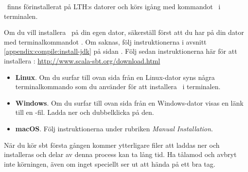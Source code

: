 \sbt\ finns förinstallerat på LTH:s datorer och körs igång med kommandot \sbt\ i terminalen.

Om du vill installera \sbt\ på din egen dator,
säkerställ först att du har  på din dator med terminalkommandot . Om  saknas, följ instruktionerna i avsnitt \ref{appendix:compile:install-jdk} på sidan \pageref{appendix:compile:install-jdk}. 
Följ sedan instruktionerna här för att installera \sbt: \url{http://www.scala-sbt.org/download.html} 

\begin{itemize}

\item \textbf{Linux}. Om du surfar till ovan sida från en Linux-dator syns några terminalkommando som du använder för att installera \sbt\ i terminalen. 

\item \textbf{Windows}. Om du surfar till ovan sida från en Windows-dator visas en länk till en -fil. Ladda ner och dubbelklicka på den.

\item \textbf{macOS}. Följ instruktionerna under rubriken \textit{Manual Installation}.

\end{itemize}

\noindent När du kör sbt första gången kommer ytterligare filer att laddas ner och installeras och delar av denna process kan ta lång tid. Ha tålamod och avbryt inte körningen, även om inget speciellt ser ut att hända på ett bra tag.

%
%


